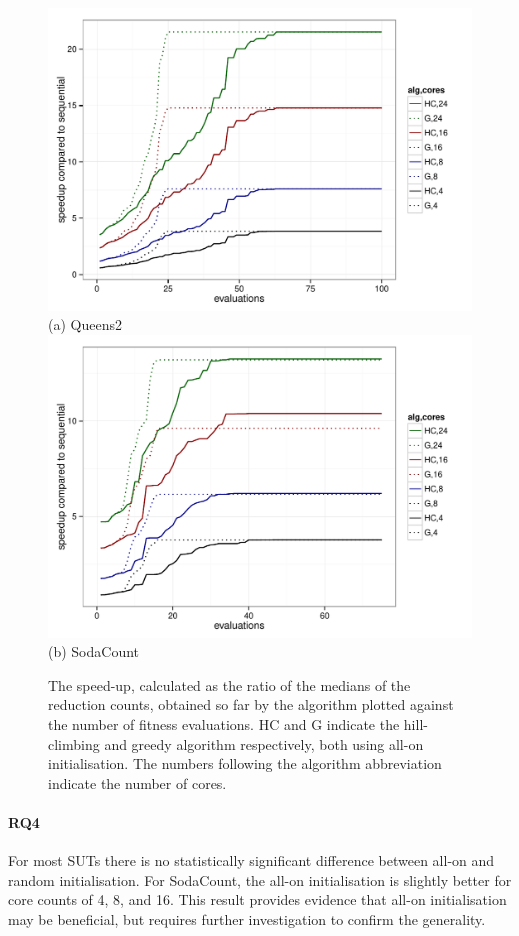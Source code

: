\begin{figure}[!ht]
\centering
\includegraphics[scale=0.5]{Blind/Figures/speedup_by_evals_Queens2_allon_median.pdf}\\
(a) Queens2\\
\includegraphics[scale=0.5]{Blind/Figures/speedup_by_evals_SodaCount_allon_median.pdf}\\
(b) SodaCount\\
\caption{The speed-up, calculated as the ratio of the medians of the reduction counts, obtained so far by the algorithm plotted against the number of fitness evaluations. HC and G indicate the hill-climbing and greedy algorithm respectively, both using all-on initialisation. The numbers following the algorithm abbreviation indicate the number of cores.}
\label{fig:evals}
\end{figure}

\paragraph{RQ4} For most SUTs there is no statistically significant difference between all-on and random initialisation.  For SodaCount, the all-on initialisation is slightly better for core counts of 4, 8, and 16.  This result provides evidence that all-on initialisation may be beneficial, but requires further investigation to confirm the generality.

